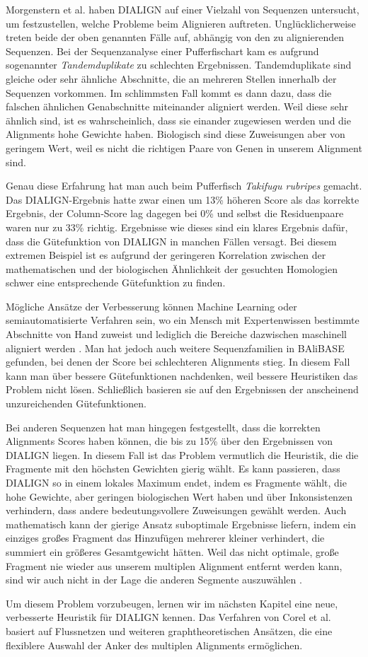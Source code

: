 Morgenstern et al. haben DIALIGN auf einer Vielzahl von Sequenzen untersucht, um festzustellen, welche Probleme beim Alignieren auftreten\cite{mpps06}. Unglücklicherweise treten beide der oben genannten Fälle auf, abhängig von den zu alignierenden Sequenzen. Bei der Sequenzanalyse einer Pufferfischart kam es aufgrund sogenannter \emph{Tandemduplikate} zu schlechten Ergebnissen. Tandemduplikate sind gleiche oder sehr ähnliche Abschnitte, die an mehreren Stellen innerhalb der Sequenzen vorkommen. Im schlimmsten Fall kommt es dann dazu, dass die falschen ähnlichen Genabschnitte miteinander aligniert werden. Weil diese sehr ähnlich sind, ist es wahrscheinlich, dass sie einander zugewiesen werden und die Alignments hohe Gewichte haben. Biologisch sind diese Zuweisungen aber von geringem Wert, weil es nicht die richtigen Paare von Genen in unserem Alignment sind. 

Genau diese Erfahrung hat man auch beim Pufferfisch \emph{Takifugu rubripes} gemacht. Das DIALIGN-Ergebnis hatte zwar einen um 13\% höheren Score als das korrekte Ergebnis, der Column-Score lag dagegen bei 0\% und selbst die Residuenpaare waren nur zu 33\% richtig. Ergebnisse wie dieses sind ein klares Ergebnis dafür, dass die Gütefunktion von DIALIGN in manchen Fällen versagt. Bei diesem extremen Beispiel ist es aufgrund der geringeren Korrelation zwischen der mathematischen und der biologischen Ähnlichkeit der gesuchten Homologien schwer eine entsprechende Gütefunktion zu finden. 

Mögliche Ansätze der Verbesserung können Machine Learning oder semiautomatisierte Verfahren sein, wo ein Mensch mit Expertenwissen bestimmte Abschnitte von Hand zuweist und lediglich die Bereiche dazwischen maschinell aligniert werden \cite{mpps06}. Man hat jedoch auch weitere Sequenzfamilien in BAliBASE gefunden, bei denen der Score bei schlechteren Alignments stieg. In diesem Fall kann man über bessere Gütefunktionen nachdenken, weil bessere Heuristiken das Problem nicht lösen. Schließlich basieren sie auf den Ergebnissen der anscheinend unzureichenden Gütefunktionen.

Bei anderen Sequenzen hat man hingegen festgestellt, dass die korrekten Alignments Scores haben können, die bis zu 15\% über den Ergebnissen von DIALIGN liegen. In diesem Fall ist das Problem vermutlich die Heuristik, die die Fragmente mit den höchsten Gewichten gierig wählt. Es kann passieren, dass DIALIGN so in einem lokales Maximum endet, indem es Fragmente wählt, die hohe Gewichte, aber geringen biologischen Wert haben und über Inkonsistenzen verhindern, dass andere bedeutungsvollere Zuweisungen gewählt werden. Auch mathematisch kann der gierige Ansatz suboptimale Ergebnisse liefern, indem ein einziges großes Fragment das Hinzufügen mehrerer kleiner verhindert, die summiert ein größeres Gesamtgewicht hätten. Weil das nicht optimale, große Fragment nie wieder aus unserem multiplen Alignment entfernt werden kann, sind wir auch nicht in der Lage die anderen Segmente auszuwählen \cite{m99}. 

Um diesem Problem vorzubeugen, lernen wir im nächsten Kapitel eine neue, verbesserte Heuristik für DIALIGN kennen. Das Verfahren von Corel et al. basiert auf Flussnetzen und weiteren graphtheoretischen Ansätzen, die eine flexiblere Auswahl der Anker des multiplen Alignments ermöglichen\cite{cpm10}.